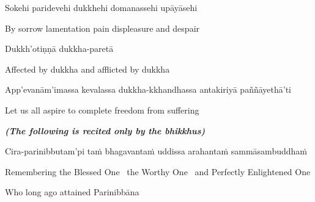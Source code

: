 Sokehi paridevehi dukkhehi domanassehi upāyāsehi

\begin{english}
  By sorrow lamentation pain displeasure\makeatletter\hyperlink{endnote25-appendix}\makeatother
  and despair\makeatletter\hyperlink{endnote26-appendix}\makeatother
\end{english}

Dukkh'otiṇṇā dukkha-paretā

\begin{english}
  Affected by dukkha and afflicted by dukkha\makeatletter\hyperlink{endnote27-appendix}\makeatother
\end{english}

\begin{pali-hang}
  App'evanām'imassa kevalassa dukkha-kkhandhassa antakiriyā paññāyethā'ti
\end{pali-hang}

\begin{english}
  Let us all aspire to complete freedom from suffering
\end{english}

\suttaRef{[SN 22.80]}

\clearpage

\begin{center}
  \textit{\textbf{(The following is recited only by the bhikkhus)}}
\end{center}

\begin{pali-hang}
  Cira-parinibbutam'pi taṁ bhagavantaṁ uddissa arahantaṁ sammāsambuddhaṁ
\end{pali-hang}

\begin{english-hang}
  Remembering the Blessed One \breathmark\ the Worthy One \breathmark\ and Perfectly Enlightened One\\
\end{english-hang}

\begin{english}
  Who long ago attained Parinibbāna
\end{english}

